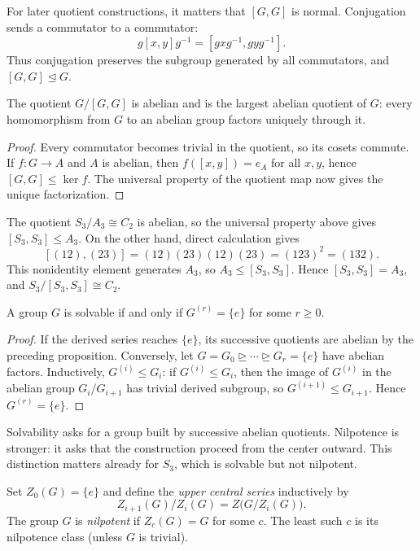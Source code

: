 For later quotient constructions, it matters that \([G,G]\) is normal.
Conjugation sends a commutator to a commutator:
\[
 g[x,y]g^{-1}=[gxg^{-1},gyg^{-1}].
\]
Thus conjugation preserves the subgroup generated by all commutators, and
\([G,G]\trianglelefteq G\).

\begin{proposition}
The quotient \(G/[G,G]\) is abelian and is the largest abelian quotient of
\(G\): every homomorphism from \(G\) to an abelian group factors uniquely
through it.
\end{proposition}
\begin{proof}
Every commutator becomes trivial in the quotient, so its cosets commute.  If
\(f:G\to A\) and \(A\) is abelian, then \(f([x,y])=e_A\) for all \(x,y\), hence
\([G,G]\leq\ker f\).  The universal property of the quotient map now gives
the unique factorization.
\end{proof}

\begin{example}
The quotient \(S_3/A_3\cong C_2\) is abelian, so the universal property above
gives \([S_3,S_3]\leq A_3\).  On the other hand, direct calculation gives
\[
 [(12),(23)]=(12)(23)(12)(23)=(123)^2=(132).
\]
This nonidentity element generates \(A_3\), so \(A_3\leq[S_3,S_3]\).  Hence
\([S_3,S_3]=A_3\), and \(S_3/[S_3,S_3]\cong C_2\).
\end{example}

\begin{theorem}
A group \(G\) is solvable if and only if \(G^{(r)}=\{e\}\) for some \(r\geq0\).
\end{theorem}
\begin{proof}
If the derived series reaches \(\{e\}\), its successive quotients are abelian by
the preceding proposition.  Conversely, let
\(G=G_0\trianglerighteq\cdots\trianglerighteq G_r=\{e\}\) have abelian factors.
Inductively, \(G^{(i)}\leq G_i\): if \(G^{(i)}\leq G_i\), then the image of
\(G^{(i)}\) in the abelian group \(G_i/G_{i+1}\) has trivial derived subgroup,
so \(G^{(i+1)}\leq G_{i+1}\).  Hence \(G^{(r)}=\{e\}\).
\end{proof}

Solvability asks for a group built by successive abelian quotients.  Nilpotence
is stronger: it asks that the construction proceed from the center outward.
This distinction matters already for \(S_3\), which is solvable but not
nilpotent.

\begin{definition}
Set \(Z_0(G)=\{e\}\) and define the \emph{upper central series} inductively by
\[Z_{i+1}(G)/Z_i(G)=Z\bigl(G/Z_i(G)\bigr).\]
The group \(G\) is \emph{nilpotent} if \(Z_c(G)=G\) for some \(c\).  The least
such \(c\) is its nilpotence class (unless \(G\) is trivial).
\end{definition}

